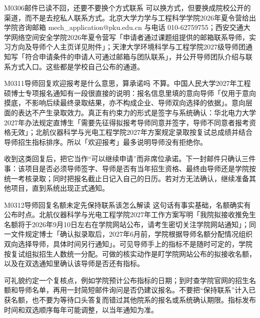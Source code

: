 \begin{qa}{M0306}{邮件已读不回，还要不要换个方式联系}
可以换方式，但要换成院校公开的渠道，而不是去挖私人联系方式。北京大学力学与工程科学学院2026年夏令营给出学院咨询邮箱 mech\_application@pku.edu.cn 与电话 010-62759755；西安交通大学网络空间安全学院2026年夏令营写「申请者通过课题组提供的邮箱联系导师，实习方向及导师个人主页详见附件」；天津大学环境科学与工程学院2027级导师团通知写「符合申请条件的申请人可通过邮箱与团队联系」，并公开导师团队介绍与联系方式入口。这些都是学校自己公布的通道。
\end{qa}

\begin{qa}{M0311}{导师回复欢迎报考是什么意思，算承诺吗}
不算。中国人民大学2027年工程硕博士专项报名通知有一段很直接的说明：报名信息里填的意向导师「仅用于意向摸底，不影响后续最终录取结果，亦不构成企业、导师双向选择的依据」。意向层面的表达不产生录取效力。真正有约束力的形式是签字与系统确认：华北电力大学2027年办法规定直博生「需要先征得拟报考导师同意并签字，导师不同意者报考资格无效」；北航仪器科学与光电工程学院2027年方案规定录取按复试总成绩并结合导师招生指标排序。所以「欢迎报考」最多说明导师没有拒绝你。

收到这类回复后，把它当作“可以继续申请”而非席位承诺。下一封邮件只确认三件事：该项目是否必须导师签字、导师是否有当年招生资格、最终由导师还是学院按统一考核录取；同时把报名截止日记入自己的日历。若对方无法确认，继续准备其他项目，直到系统出现正式通知。
\end{qa}

\begin{qa}{M0312}{导师回复名额未定先保持联系该怎么解读}
这句话有事实基础，名额确实有公布时点。北航仪器科学与光电工程学院2027年工作方案写明「我院拟接收推免生名额将于2026年9月10日左右在学院网站公布，请考生密切关注学院网站通知」；同一文件规定博士「确认拟录取后，2027年6月前，学院根据导师名额分配情况组织双向选择导师，具体时间另行通知」。可见导师手上的指标不是随时可定的，学院按复试组拟招生人数统一分配。可做的核实动作是盯学院网站公布的拟接收名额，以及在双选通知里确认该导师是否还有指标。

可礼貌约定一个复核点，例如学院预计公布指标的日期；到时查学院官网的招生名额和导师名单，再用一封简短邮件询问是否仍建议报名。不要把“保持联系”计入已获名额，也不要为等待口头答复而错过其他院系的报名或系统确认期限。指标发布时间和双选顺序每年可能调整，以当年通知为准。
\end{qa}

